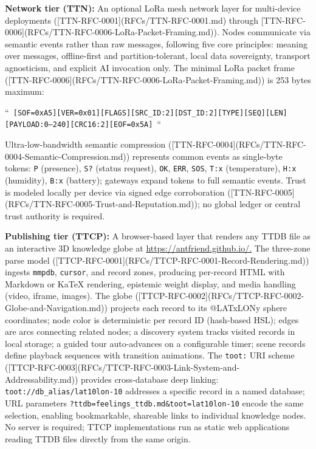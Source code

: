 \documentclass[11pt]{article}
\begin{document}
\textbf{Network tier (TTN):} An optional LoRa mesh network layer for multi-device deployments ([TTN-RFC-0001](RFCs/TTN-RFC-0001.md) through [TTN-RFC-0006](RFCs/TTN-RFC-0006-LoRa-Packet-Framing.md)). Nodes communicate via semantic events rather than raw messages, following five core principles: meaning over messages, offline-first and partition-tolerant, local data sovereignty, transport agnosticism, and explicit AI invocation only. The minimal LoRa packet frame ([TTN-RFC-0006](RFCs/TTN-RFC-0006-LoRa-Packet-Framing.md)) is 253 bytes maximum:

``\texttt{ [SOF=0xA5][VER=0x01][FLAGS][SRC\_ID:2][DST\_ID:2][TYPE][SEQ][LEN][PAYLOAD:0–240][CRC16:2][EOF=0x5A] }``

Ultra-low-bandwidth semantic compression ([TTN-RFC-0004](RFCs/TTN-RFC-0004-Semantic-Compression.md)) represents common events as single-byte tokens: \texttt{P} (presence), \texttt{S?} (status request), \texttt{OK}, \texttt{ERR}, \texttt{SOS}, \texttt{T:x} (temperature), \texttt{H:x} (humidity), \texttt{B:x} (battery); gateways expand tokens to full semantic events. Trust is modeled locally per device via signed edge corroboration ([TTN-RFC-0005](RFCs/TTN-RFC-0005-Trust-and-Reputation.md)); no global ledger or central trust authority is required.

\textbf{Publishing tier (TTCP):} A browser-based layer that renders any TTDB file as an interactive 3D knowledge globe at \url{https://antfriend.github.io/.} The three-zone parse model ([TTCP-RFC-0001](RFCs/TTCP-RFC-0001-Record-Rendering.md)) ingests \texttt{mmpdb}, \texttt{cursor}, and record zones, producing per-record HTML with Markdown or KaTeX rendering, epistemic weight display, and media handling (video, iframe, images). The globe ([TTCP-RFC-0002](RFCs/TTCP-RFC-0002-Globe-and-Navigation.md)) projects each record to its @LATxLONy sphere coordinates; node color is deterministic per record ID (hash-based HSL); edges are arcs connecting related nodes; a discovery system tracks visited records in local storage; a guided tour auto-advances on a configurable timer; scene records define playback sequences with transition animations. The \texttt{toot:} URI scheme ([TTCP-RFC-0003](RFCs/TTCP-RFC-0003-Link-System-and-Addressability.md)) provides cross-database deep linking: \texttt{toot://db\_alias/lat10lon-10} addresses a specific record in a named database; URL parameters \texttt{?ttdb=feelings\_ttdb.md\&toot=lat10lon-10} encode the same selection, enabling bookmarkable, shareable links to individual knowledge nodes. No server is required; TTCP implementations run as static web applications reading TTDB files directly from the same origin.
\end{document}
